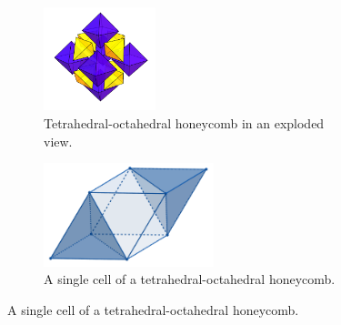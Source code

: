 \documentclass[c, 10pt]{beamer}
\begin{document}
\begin{frame}[plain]
{\begin{figure}
    \centering
    \begin{minipage}{0.45\textwidth}
	    \begin{figure}
	\begin{center}
		\includegraphics[height = 3cm]{./FigureLayout/tetra-exploded.PNG}
	\end{center}
	\caption{\scriptsize Tetrahedral-octahedral honeycomb in an exploded view.}
\end{figure}
    \end{minipage}\hfill
    \begin{minipage}{0.45\textwidth}
        \centering
\begin{figure}[p]

	\begin{center}
		\includegraphics[height = 3cm]{./FigureLayout/tetra-tess.png}
	\end{center}

	\caption{\scriptsize A single cell of a tetrahedral-octahedral honeycomb.}
\end{figure}
    \end{minipage}
\end{figure}
}



\end{frame}
\end{document}

